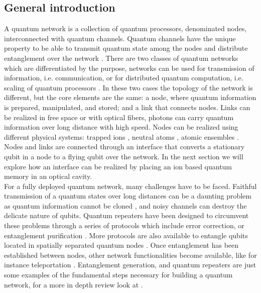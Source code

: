 \subsection{General introduction}
A quantum network is a collection of quantum processors, denominated nodes, interconnected with quantum channels. Quantum channels have the unique property to be able to transmit quantum state among the nodes and distribute entanglement over the network \cite{kimble}. There are two classes of quantum networks which are differentiated by the purpose, networks can be used for transmission of information, i.e. communication, or for distributed quantum computation, i.e. scaling of quantum processors \cite{ion_quantumnetwork}.
In these two cases the topology of the network is different, but the core elements are the same: a node, where quantum information is prepared, manipulated, and stored; and a link that connects nodes. Links can be realized in free space \cite{Hughes2002} or with optical fibers, photons can carry quantum information over long distance with high speed. Nodes can be realized using different physical systems: trapped ions \cite{ion_quantumnetwork}, neutral atoms \cite{Ritter2012}, atomic ensembles \cite{kimble}. Nodes and links are connected through an interface that converts a stationary qubit in a node to a flying qubit over the network.  In the next section we will explore how an interface can be realized by placing an ion based quantum memory in an optical cavity.\\
For a fully deployed quantum network, many challenges have to be faced. Faithful transmission of a quantum states over long distances can be a daunting problem as quantum information cannot be cloned \cite{nocloning}, and noisy channels can destroy the delicate nature of qubits. Quantum repeaters have been designed \cite{quantumrepeters} to circumvent these problems through a series of protocols which include error correction, or entanglement purification \cite{Pan2001}. More protocols are also available to  entangle qubits located in spatially separated quantum nodes \cite{Duan2001}. Once entanglement has been established between nodes, other network functionalities become available, like for instance teleportation \cite{PhysRevLett.70.1895}. Entanglement generation, and quantum repeaters are just some examples of the fundamental steps necessary for building a quantum network, for a more in depth review look at \cite{Wehnereaam9288}.


